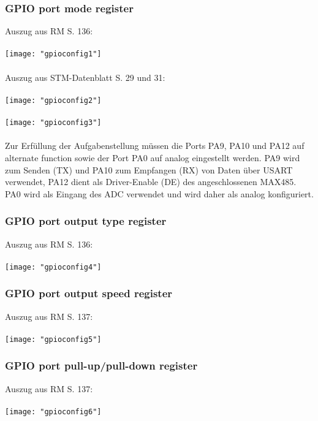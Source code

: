 \documentclass[11pt]{report}
\begin{document}
			\subsubsection{GPIO port mode register}
				Auszug aus RM S. 136:\\
				\\\texttt{[image: "gpioconfig1"]}\\
				\\Auszug aus STM-Datenblatt S. 29 und 31:\\
				\\\texttt{[image: "gpioconfig2"]}\\
				\\\texttt{[image: "gpioconfig3"]}\\
				\\Zur Erfüllung der Aufgabenstellung müssen die Ports PA9, PA10 und PA12 auf alternate function sowie der Port PA0 auf analog eingestellt werden. PA9 wird zum Senden (TX) und PA10 zum Empfangen (RX) von Daten über USART verwendet, PA12 dient als Driver-Enable (DE) des angeschlossenen MAX485. PA0 wird als Eingang des ADC verwendet und wird daher als analog konfiguriert.
			\subsubsection{GPIO port output type register}
				Auszug aus RM S. 136:\\
				\\\texttt{[image: "gpioconfig4"]}\\
			\subsubsection{GPIO port output speed register}
				Auszug aus RM S. 137:\\
				\\\texttt{[image: "gpioconfig5"]}\\
			\subsubsection{GPIO port pull-up/pull-down register}
				Auszug aus RM S. 137:\\
				\\\texttt{[image: "gpioconfig6"]}\\
\end{document}
